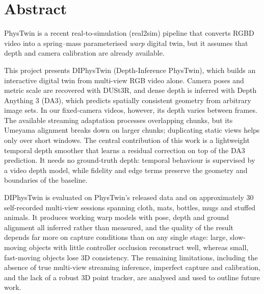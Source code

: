 \documentclass[11pt]{report}
\begin{document}
\maketitle

\chapter*{Abstract}
PhysTwin is a recent real-to-simulation (real2sim) pipeline that converts RGBD video into a
spring--mass parameterised \emph{warp} digital twin, but it assumes that depth and camera
calibration are already available.

This project presents DIPhysTwin (Depth-Inference PhysTwin), which builds an interactive digital
twin from multi-view RGB video alone. Camera poses and metric scale are recovered with DUSt3R, and
dense depth is inferred with Depth Anything 3 (DA3), which predicts spatially consistent geometry
from arbitrary image sets. In our fixed-camera videos, however, its depth varies between frames.
The available streaming adaptation processes overlapping chunks, but its Umeyama alignment breaks
down on larger chunks; duplicating static views helps only over short windows. The central
contribution of this work is a lightweight temporal depth smoother that learns a residual
correction on top of the DA3 prediction. It needs no ground-truth depth: temporal behaviour is
supervised by a video depth model, while fidelity and edge terms preserve the geometry and
boundaries of the baseline.

DIPhysTwin is evaluated on PhysTwin's released data and on approximately 30 self-recorded
multi-view sessions spanning cloth, mats, bottles, mugs and stuffed animals. It produces working
warp models with pose, depth and ground alignment all inferred rather than measured, and the
quality of the result depends far more on capture conditions than on any single stage: large,
slow-moving objects with little controller occlusion reconstruct well, whereas small, fast-moving
objects lose 3D consistency. The remaining limitations, including the absence of true multi-view
streaming inference, imperfect capture and calibration, and the lack of a robust 3D point tracker,
are analysed and used to outline future work.


\tableofcontents
\end{document}
